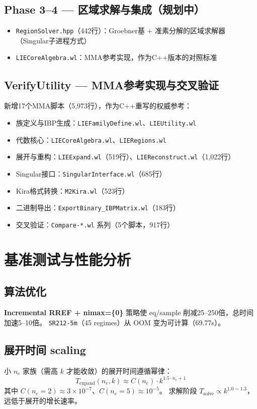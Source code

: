 \documentclass[12pt,a4paper]{article}
\begin{document}
\subsection{Phase 3--4 — 区域求解与集成（规划中）}
\begin{itemize}[nosep]
    \item \texttt{RegionSolver.hpp}（442行）：Groebner基 + 准素分解的区域求解器（Singular子进程方式）
    \item \texttt{LIECoreAlgebra.wl}：MMA参考实现，作为C++版本的对照标准
\end{itemize}

\subsection{VerifyUtility — MMA参考实现与交叉验证}
新增17个MMA脚本（5,973行），作为C++重写的权威参考：
\begin{itemize}[nosep]
    \item 族定义与IBP生成：\texttt{LIEFamilyDefine.wl}、\texttt{LIEUtility.wl}
    \item 代数核心：\texttt{LIECoreAlgebra.wl}、\texttt{LIERegions.wl}
    \item 展开与重构：\texttt{LIEExpand.wl}（519行）、\texttt{LIEReconstruct.wl}（1,022行）
    \item Singular接口：\texttt{SingularInterface.wl}（685行）
    \item Kira格式转换：\texttt{M2Kira.wl}（523行）
    \item 二进制导出：\texttt{ExportBinary\_IBPMatrix.wl}（183行）
    \item 交叉验证：\texttt{Compare-*.wl} 系列（5个脚本，917行）
\end{itemize}

\section{基准测试与性能分析}

\subsection{算法优化}
\textbf{Incremental RREF + nimax=\{0\}} 策略使 eq/sample 削减25--250倍，总时间加速5--10倍。
\texttt{SR212-5m}（45 regimes）从 OOM 变为可计算（69.77s）。

\subsection{展开时间 scaling}
小 $n_e$ 家族（需高 $k$ 才能收敛）的展开时间遵循幂律：
\[
T_{\text{expand}}(n_e, k) \approx C(n_e) \cdot k^{1.5\cdot n_e + 1}
\]
其中 $C(n_e=2) \approx 3\times10^{-7}$、$C(n_e=5) \approx 10^{-5}$。
求解阶段 $T_{\text{solve}} \propto k^{1.0\sim1.3}$，远低于展开的增长速率。
\end{document}
